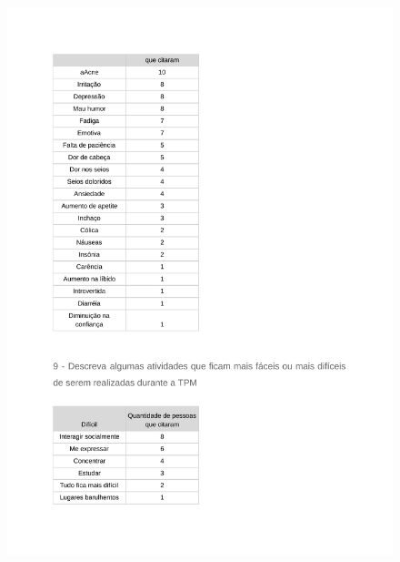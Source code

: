 \begin{apendicesenv}
        \begin{figure}[ht]
            \centering
            \includegraphics[keepaspectratio=true,scale=0.7]{figuras/Tab21.pdf}
        \end{figure}
        

\end{apendicesenv}
